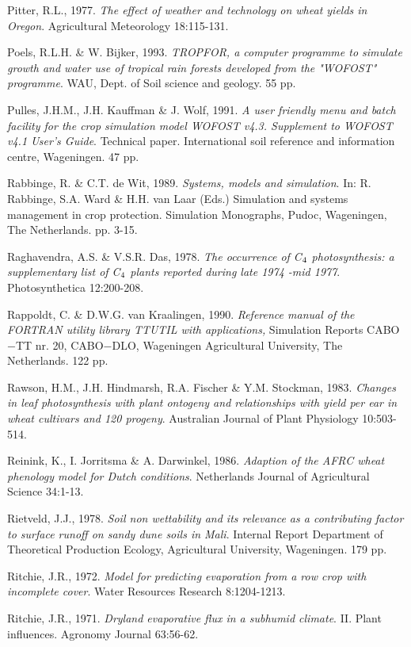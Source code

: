 Pitter, R.L., 1977. {\it The effect of weather and technology on wheat yields in Oregon\/}. Agricultural
Meteorology 18:115-131.

Poels, R.L.H. \& W. Bijker, 1993. {\it TROPFOR, a computer pro\-gramme to simulate growth and water
use of tropical rain forests developed from the "WOFOST" programme\/}. WAU, Dept. of Soil science
and geology. 55 pp.

Pulles, J.H.M., J.H. Kauffman \& J. Wolf, 1991. {\it A user {\nobreak}friendly menu and batch facility for the crop
simulation model WOFOST v4.3. Supplement to WOFOST v4.1 User's Guide\/}. Technical paper.
International soil reference and information centre, Wageningen. 47 pp.

Rabbinge, R. \& C.T. de Wit, 1989. {\it Systems, models and simulation\/}. In: R. Rabbinge, S.A. Ward
\& H.H. van Laar (Eds.) Simulation and systems management in crop protection. Simulation
Monographs, Pudoc, Wageningen, The Netherlands. pp. 3-15.

Raghavendra, A.S. \& V.S.R. Das, 1978. {\it The occurrence of C$_{{\rm 4}}$ photosynthesis: a supplementary list
of C$_{{\rm 4}}$ plants reported during late 1974 -mid 1977\/}. Photosynthetica 12:200-208.

Rappoldt, C. \& D.W.G. van Kraalingen, 1990. {\it Reference manual of the FORTRAN utility library
TTUTIL with applications,\/} Simulation Reports CABO$-$TT nr. 20, CABO$-$DLO, Wageningen
Agricultural University, The Netherlands. 122 pp. 

Rawson, H.M., J.H. Hindmarsh, R.A. Fischer \& Y.M. Stockman, 1983. {\it Changes in leaf
photosynthesis with plant ontogeny and relationships with yield per ear in wheat cultivars and 120
progeny\/}. Australian Journal of Plant Physiology 10:503-514.

Reinink, K., I. Jorritsma \& A. Darwinkel, 1986. {\it Adaption of the AFRC wheat phenology model for
Dutch conditions\/}. Netherlands Journal of Agricultural Science 34:1-13.

Rietveld, J.J., 1978. {\it Soil non wettability and its relevance as a contributing factor to surface runoff
on sandy dune soils in Mali\/}. Internal Report Department of Theoretical Production Ecology,
Agricultural University, Wageningen. 179 pp.

Ritchie, J.R., 1972. {\it Model for predicting evaporation from a row crop with incomplete cover\/}. Water
Resources Research 8:1204-1213.

Ritchie, J.R., 1971. {\it Dryland evaporative flux in a subhumid climate\/}. II. Plant influences. Agronomy
Journal 63:56-62.

